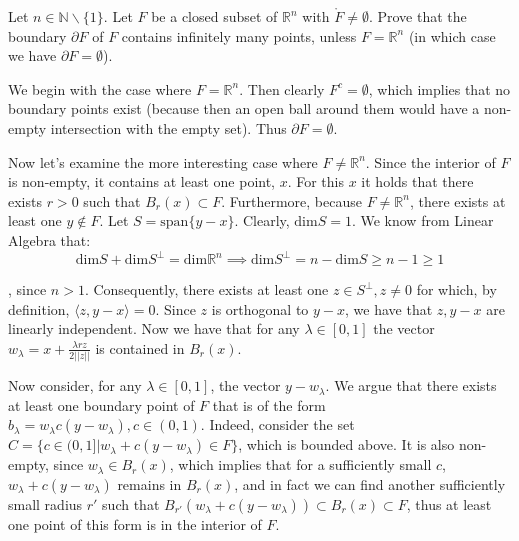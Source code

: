 \begin{exercise}{7}
    Let $n \in \mathbb{N} \backslash \{1\}$. Let $F$ be a closed subset of $\mathbb{R}^n$ with $\mathring{F} \neq \emptyset$. Prove that the boundary $\partial F$ of $F$ contains infinitely many points, unless $F = \mathbb{R}^n$ (in which case we have $\partial F = \emptyset$).
\end{exercise}

\begin{solution}

    We begin with the case where $F = \mathbb{R}^n$. Then clearly $F^c = \emptyset$, which implies that no boundary points exist (because then an open ball around them would have a non-empty intersection with the empty set). Thus $\partial F = \emptyset$.

    Now let's examine the more interesting case where $F \neq \mathbb{R}^n$. Since the interior of $F$ is non-empty, it contains at least one point, $x$. For this $x$ it holds that there exists $r > 0$ such that $B_r(x) \subset F$. Furthermore, because $F \neq \mathbb{R}^n$, there exists at least one $y \notin F$. Let $S = \text{span}\{y - x\}$. Clearly, $\text{dim} S = 1$. We know from Linear Algebra that:
    $$\text{dim} S + \text{dim} S^\bot = \text{dim} \mathbb{R}^n \implies \text{dim} S^\bot = n - \text{dim} S \geq n - 1 \geq 1$$

    , since $n > 1$. Consequently, there exists at least one $z \in S^\bot, z \neq 0$ for which, by definition, $\langle z, y - x \rangle = 0$. Since $z$ is orthogonal to $y - x$, we have that $z, y - x$ are linearly independent. Now we have that for any $\lambda \in [0, 1]$ the vector $w_\lambda = x + \frac{\lambda rz}{2\lvert \lvert z \rvert \rvert}$ is contained in $B_r(x)$.
    
    Now consider, for any $\lambda \in [0, 1]$, the vector $y - w_\lambda$. We argue that there exists at least one boundary point of $F$ that is of the form $b_\lambda = w_\lambda c(y-w_\lambda), c \in (0, 1)$. Indeed, consider the set $C = \{c \in (0, 1] \lvert w_\lambda + c(y - w_\lambda) \in F\}$, which is bounded above. It is also non-empty, since $w_\lambda \in B_r(x)$, which implies that for a sufficiently small $c$,  $w_\lambda + c(y - w_\lambda)$ remains in $B_r(x)$, and in fact we can find another sufficiently small radius $r'$ such that $B_{r'}(w_\lambda + c(y - w_\lambda)) \subset B_r(x) \subset F$, thus at least one point of this form is in the interior of $F$. 
    

\end{solution}
